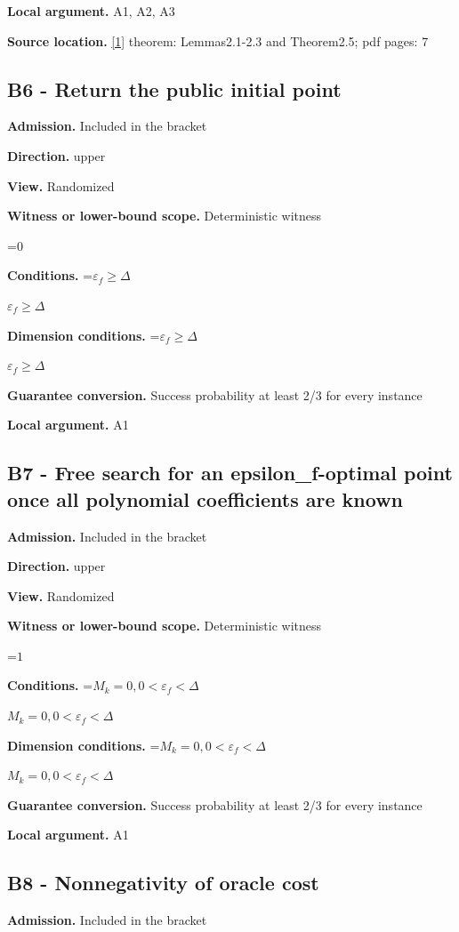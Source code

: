 \documentclass[10pt,a4paper]{article}
\newcommand{\AtlasMath}[1]{\par\begingroup\centering\setbox0=\hbox{$\displaystyle #1$}\ifdim\wd0>1.4\linewidth\typeout{ATLAS WIDE FORMULA: \the\wd0}\fi\ifdim\wd0>\linewidth\resizebox{\linewidth}{!}{\box0}\else\box0\fi\par\endgroup}
\newcommand{\AtlasInlineMath}[1]{\begingroup\setbox0=\hbox{$#1$}\ifdim\wd0>.4\linewidth\endgroup\AtlasMath{#1}\else\endgroup$#1$\fi}
\begin{document}
\textbf{Local argument.} A1, A2, A3

\textbf{Source location.} \href{https://optimization-online.org/wp-content/uploads/2015/06/4970.pdf}{[1]} theorem: Lemmas2.1-2.3 and Theorem2.5; pdf pages: 7

\subsection{B6 - Return the public initial point}
\textbf{Admission.} Included in the bracket

\textbf{Direction.} upper

\textbf{View.} Randomized

\textbf{Witness or lower-bound scope.} Deterministic witness

\AtlasMath{0}
\textbf{Conditions.} \AtlasInlineMath{\varepsilon_f\ge \Delta}

\textbf{Dimension conditions.} \AtlasInlineMath{\varepsilon_f\ge \Delta}

\textbf{Guarantee conversion.} Success probability at least 2/3 for every instance

\textbf{Local argument.} A1

\subsection{B7 - Free search for an epsilon\_f-optimal point once all polynomial coefficients are known}
\textbf{Admission.} Included in the bracket

\textbf{Direction.} upper

\textbf{View.} Randomized

\textbf{Witness or lower-bound scope.} Deterministic witness

\AtlasMath{1}
\textbf{Conditions.} \AtlasInlineMath{M_k=0,0<\varepsilon_f<\Delta}

\textbf{Dimension conditions.} \AtlasInlineMath{M_k=0,0<\varepsilon_f<\Delta}

\textbf{Guarantee conversion.} Success probability at least 2/3 for every instance

\textbf{Local argument.} A1

\subsection{B8 - Nonnegativity of oracle cost}
\textbf{Admission.} Included in the bracket
\end{document}
